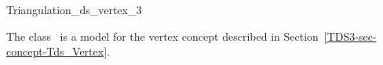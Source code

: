 

\begin{ccRefClass}{Triangulation_ds_vertex_3}  %


\ccDefinition
  
The class \ccRefName\ is a model for the vertex
concept described in Section~\ref{TDS3-sec-concept-Tds_Vertex}.


\ccIsModel


\ccSeeAlso




\end{ccRefClass}


